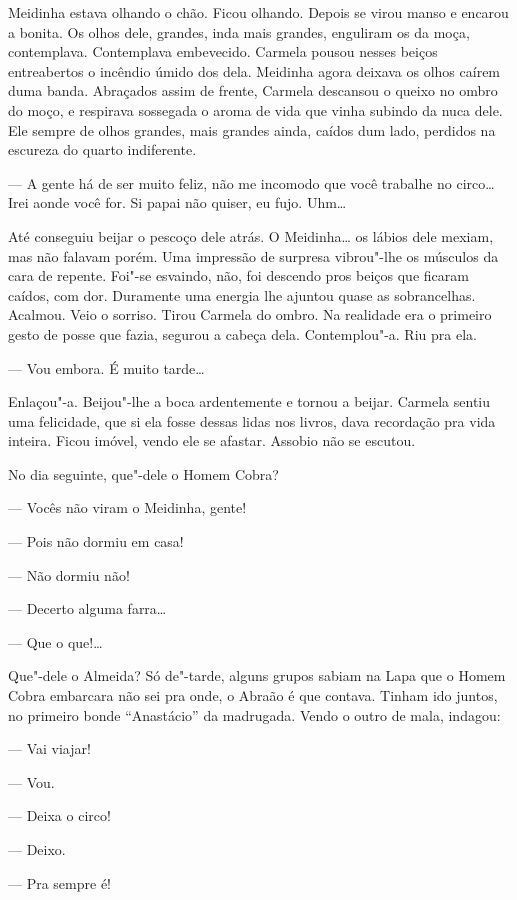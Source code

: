 \begin{linenumbers}
Meidinha estava olhando o chão. Ficou olhando. Depois se virou manso e
encarou a bonita. Os olhos dele, grandes, inda mais grandes, enguliram
os da moça, contemplava. Contemplava embevecido. Carmela pousou nesses
beiços entreabertos o incêndio úmido dos dela. Meidinha agora deixava os
olhos caírem duma banda. Abraçados assim de frente, Carmela descansou o
queixo no ombro do moço, e respirava sossegada o aroma de vida que vinha
subindo da nuca dele. Ele sempre de olhos grandes, mais grandes ainda,
caídos dum lado, perdidos na escureza do quarto indiferente.

--- A gente há de ser muito feliz, não me incomodo que você trabalhe no
circo\ldots{} Irei aonde você for. Si papai não quiser, eu fujo. Uhm\ldots{}

Até conseguiu beijar o pescoço dele atrás. O Meidinha\ldots{} os lábios dele
mexiam, mas não falavam porém. Uma impressão de surpresa vibrou"-lhe os
músculos da cara de repente. Foi"-se esvaindo, não, foi descendo pros
beiços que ficaram caídos, com dor. Duramente uma energia lhe ajuntou
quase as sobrancelhas. Acalmou. Veio o sorriso. Tirou Carmela do ombro.
Na realidade era o primeiro gesto de posse que fazia, segurou a cabeça
dela. Contemplou"-a. Riu pra ela.

--- Vou embora. É muito tarde\ldots{}

Enlaçou"-a. Beijou"-lhe a boca ardentemente e tornou a beijar. Carmela
sentiu uma felicidade, que si ela fosse dessas lidas nos livros, dava
recordação pra vida inteira. Ficou imóvel, vendo ele se afastar. Assobio
não se escutou.

No dia seguinte, que"-dele o Homem Cobra?

--- Vocês não viram o Meidinha, gente!

--- Pois não dormiu em casa!

--- Não dormiu não!

--- Decerto alguma farra\ldots{}

--- Que o que!\ldots{}

Que"-dele o Almeida? Só de"-tarde, alguns grupos sabiam na Lapa que o
Homem Cobra embarcara não sei pra onde, o Abraão é que contava. Tinham
ido juntos, no primeiro bonde ``Anastácio'' da madrugada. Vendo o outro
de mala, indagou:

--- Vai viajar!

--- Vou.

--- Deixa o circo!

--- Deixo.

--- Pra sempre é!


\end{linenumbers}
